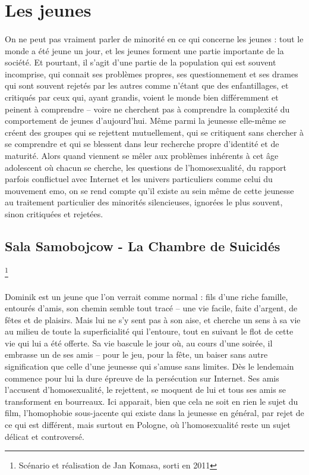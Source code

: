 \documentclass[12pt, twocolumn]{amsart}
\begin{document}
\clearpage
\section{Les jeunes}

\paragraph{}
On ne peut pas vraiment parler de minorité en ce qui concerne les jeunes : tout le monde a été jeune un jour, et les jeunes forment une partie importante de la société. Et pourtant, il s’agit d’une partie de la population qui est souvent incomprise, qui connait ses problèmes propres, ses questionnement et ses drames qui sont souvent rejetés par les autres comme n’étant que des enfantillages, et critiqués par ceux qui, ayant grandis, voient le monde bien différemment et peinent à comprendre – voire ne cherchent pas à comprendre la complexité du comportement de jeunes d’aujourd’hui. Même parmi la jeunesse elle-même se créent des groupes qui se rejettent mutuellement, qui se critiquent sans chercher à se comprendre et qui se blessent dans leur recherche propre d’identité et de maturité. Alors quand viennent se mêler aux problèmes inhérents à cet âge adolescent où chacun se cherche, les questions de l’homosexualité, du rapport parfois conflictuel avec Internet et les univers particuliers comme celui du mouvement emo, on se rend compte qu’il existe au sein même de cette jeunesse au traitement particulier des minorités silencieuses, ignorées le plus souvent, sinon critiquées et rejetées.

\subsection*{Sala Samobojcow - La Chambre de Suicidés}\footnote{Scénario et réalisation de Jan Komasa, sorti en 2011}
\paragraph{}
Dominik est un jeune que l’on verrait comme normal : fils d’une riche famille, entourés d’amis, son chemin semble tout tracé – une vie facile, faite d’argent, de fêtes et de plaisirs. Mais lui ne s’y sent pas à son aise, et cherche un sens à sa vie au milieu de toute la superficialité qui l’entoure, tout en suivant le flot de cette vie qui lui a été offerte. Sa vie bascule le jour où, au cours d’une soirée, il embrasse un de ses amis – pour le jeu, pour la fête, un baiser sans autre signification que celle d’une jeunesse qui s’amuse sans limites. Dès le lendemain commence pour lui la dure épreuve de la persécution sur Internet. Ses amis l’accusent d’homosexualité, le rejettent, se moquent de lui et tous ses amis se transforment en bourreaux. Ici apparait, bien que cela ne soit en rien le sujet du film, l’homophobie sous-jacente qui existe dans la jeunesse en général, par rejet de ce qui est différent, mais surtout en Pologne, où l’homosexualité reste un sujet délicat et controversé.
\end{document}
